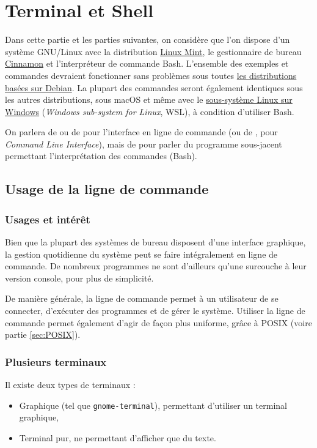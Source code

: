 \section{Terminal et Shell}
Dans cette partie et les parties suivantes, on considère que l'on dispose d'un système GNU/Linux avec la distribution \href{https://linuxmint.com}{Linux Mint}, le gestionnaire de bureau \href{https://github.com/linuxmint/Cinnamon}{Cinnamon} et l'interpréteur de commande Bash. L'ensemble des exemples et commandes devraient fonctionner sans problèmes sous toutes \href{https://www.debian.org/derivatives/index.fr.html}{les distributions basées sur Debian}. La plupart des commandes seront également identiques sous les autres distributions, sous macOS et même avec le \href{https://docs.microsoft.com/fr-fr/windows/wsl/install-win10}{sous-système Linux sur Windows} (\textit{Windows sub-system for Linux}, WSL), à condition d'utiliser Bash.

 On parlera de  ou de  pour l'interface en ligne de commande (ou de , pour \textit{Command Line Interface}), mais de  pour parler du programme sous-jacent permettant l'interprétation des commandes (Bash).

\subsection{Usage de la ligne de commande}

\subsubsection{Usages et intérêt}

Bien que la plupart des systèmes de bureau disposent d'une interface graphique, la gestion quotidienne du système peut se faire intégralement en ligne de commande. De nombreux programmes ne sont d'ailleurs qu'une surcouche à leur version console, pour plus de simplicité.

De manière générale, la ligne de commande permet à un utilisateur de se connecter, d'exécuter des programmes et de gérer le système. Utiliser la ligne de commande permet également d'agir de façon plus uniforme, grâce à POSIX (voire partie \ref{sec:POSIX}).

\subsubsection{Plusieurs terminaux}
Il existe deux types de terminaux : 
\begin{itemize}
    \item Graphique (tel que \texttt{gnome-terminal}), permettant d'utiliser un terminal graphique,
    \item Terminal pur, ne permettant d'afficher que du texte.
\end{itemize}
\vspace{\baselineskip}

